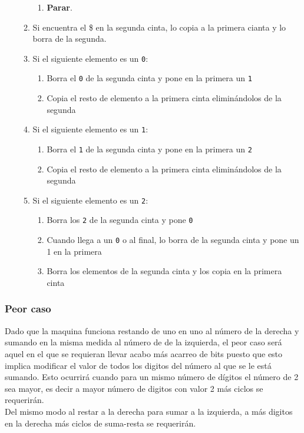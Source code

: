 \begin{itemize}
\begin{enumerate}
\begin{enumerate}[1.]
            \item \textbf{Parar}.
        \end{enumerate}
        \item Si encuentra el \$ en la segunda cinta, lo copia a la primera cianta y lo borra de la segunda.
        \item Si el siguiente elemento es un \texttt{0}:
        \begin{enumerate}[1.]
            \item Borra el \texttt{0} de la segunda cinta y pone en la primera un \texttt{1}
            \item Copia el resto de elemento a la primera cinta eliminándolos de la segunda
        \end{enumerate}
        \item Si el siguiente elemento es un \texttt{1}:
        \begin{enumerate}
            \item Borra el \texttt{1} de la segunda cinta y pone en la primera un \texttt{2}
            \item Copia el resto de elemento a la primera cinta eliminándolos de la segunda
        \end{enumerate}
        \item Si el siguiente elemento es un \texttt{2}:
        \begin{enumerate}[1.]
            \item Borra los \texttt{2} de la segunda cinta y pone \texttt{0}
            \item Cuando llega a un \texttt{0} o al final, lo borra de la segunda cinta y pone un 1 en la primera
            \item Borra los elementos de la segunda cinta y los copia en la primera cinta
        \end{enumerate}
    \end{enumerate}
\end{itemize}




\subsubsection*{Peor caso}
Dado que la maquina funciona restando de uno en uno al número de la derecha y sumando en la misma medida al número de de la izquierda, el peor caso será aquel en el que se requieran llevar acabo más acarreo de bits puesto que esto implica modificar el valor de todos los digitos del número al que se le está sumando. Esto ocurrirá cuando para un mismo número de dígitos el número de 2 sea mayor, es decir a mayor número de digitos con valor 2 más ciclos se requerirán.\\
Del mismo modo al restar a la derecha para sumar a la izquierda, a más digitos en la derecha más ciclos de suma-resta se requerirán.

